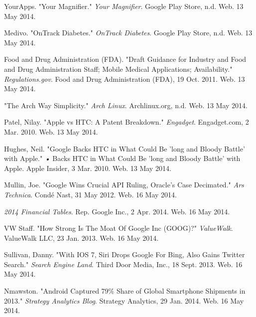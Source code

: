 \documentclass[conference]{IEEEtran}
\begin{document}
\begin{thebibliography}{1}
YourApps. "Your Magnifier." \textit{Your Magnifier}. Google Play Store, n.d. Web. 13 May 2014.

Medivo. "OnTrack Diabetes." \textit{OnTrack Diabetes}. Google Play Store, n.d. Web. 13 May 2014.

Food and Drug Administration (FDA). "Draft Guidance for Industry and Food and Drug Administration Staff; Mobile Medical Applications; Availability." \textit{Regulations.gov}. Food and Drug Administration (FDA), 19 Oct. 2011. Web. 13 May 2014.

"The Arch Way Simplicity." \textit{Arch Linux}. Archlinux.org, n.d. Web. 13 May 2014.

Patel, Nilay. "Apple vs HTC: A Patent Breakdown." \textit{Engadget}. Engadget.com, 2 Mar. 2010. Web. 13 May 2014.

Hughes, Neil. "Google Backs HTC in What Could Be 'long and Bloody Battle' with Apple." \textit{•} Backs HTC in What Could Be 'long and Bloody Battle' with Apple. Apple Insider, 3 Mar. 2010. Web. 13 May 2014.

Mullin, Joe. "Google Wins Crucial API Ruling, Oracle's Case Decimated." \textit{Ars Technica}. Condé Nast, 31 May 2012. Web. 16 May 2014.

\textit{2014 Financial Tables}. Rep. Google Inc., 2 Apr. 2014. Web. 16 May 2014.

VW Staff. "How Strong Is The Moat Of Google Inc (GOOG)?" \textit{ValueWalk}. ValueWalk LLC, 23 Jan. 2013. Web. 16 May 2014.

Sullivan, Danny. "With IOS 7, Siri Drops Google For Bing, Also Gains Twitter Search." \textit{Search Engine Land}. Third Door Media, Inc., 18 Sept. 2013. Web. 16 May 2014.

Nmawston. "Android Captured 79\% Share of Global Smartphone Shipments in 2013." \textit{Strategy Analytics Blog}. Strategy Analytics, 29 Jan. 2014. Web. 16 May 2014.



\end{thebibliography}
\end{document}
